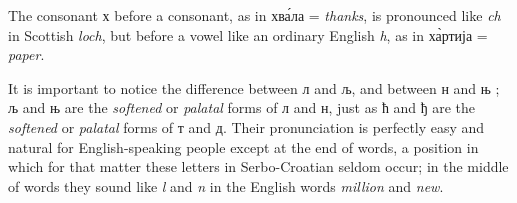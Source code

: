         The consonant {х} before a consonant, as in
        хв\'{а}ла = \textit{thanks}, is pronounced like \textit{ch}
        in Scottish \textit{loch}, but before a vowel like an ordinary English
        \textit{h}, as in х\`{а}ртија = \textit{paper}.

        It is important to notice the difference between л and љ, and between н
        and њ ; љ and њ are the \textit{softened} or \textit{palatal} forms of
        л and н, just as ћ and ђ are the \textit{softened} or \textit{palatal}
        forms of т and д. Their pronunciation is perfectly easy and natural for
        English-speaking people except at the end of words, a position in which
        for that matter these letters in Serbo-Croatian seldom occur; in the
        middle of words they sound like \textit{l} and \emph{n} in the English
        words \emph{million} and \emph{new}. 
